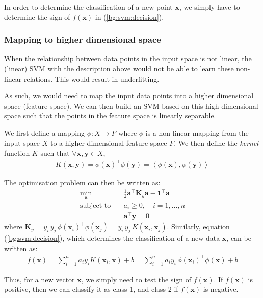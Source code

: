 \documentclass[12pt, twoside, a4paper]{article}
\def\vec{\boldsymbol}
\begin{document}
In order to determine the classification of a new  point $\vec{x}$, we simply have to determine the sign of $f(\vec{x})$ in (\ref{bg:svm:decision}).

\subsubsection{Mapping to higher dimensional space}
When the relationship between data points in the input space is not linear, the (linear) SVM with the description above would not be able to learn these non-linear relations. This would result in underfitting.

As such, we would need to map the input data points into a higher dimensional space (feature space). We can then build an SVM based on this high dimensional space such that the points in the feature space is linearly separable.

We first define a mapping $\phi : X \rightarrow F$ where $\phi$ is a non-linear mapping from the input space $X$ to a higher dimensional feature space $F$. We then define the \textit{kernel} function $K$ such that $\forall \vec x, \vec y \in X$,
\begin{align*}
K(\vec x, \vec y) = \phi(\vec x)^\top \phi(\vec{y}) = \left\langle \phi(\vec x) , \phi(\vec{y}) \right\rangle
\end{align*}

The optimisation problem can then be written as:
\begin{align*}
\min_{\vec a} \quad &\frac{1}{2} \vec{a}^\top \vec{K}_y \vec{a} - \vec{1}^\top \vec a \\
\text{subject to} \quad &a_i \geq 0, \quad i = 1, \dots , n \\
&\vec{a}^\top \vec y = 0
\end{align*}
where $\vec{K}_y = y_i \, y_j \, \phi(\vec{x}_i)^\top \phi(\vec{x}_j) = y_i \, y_j \, K(\vec{x}_i, \vec{x}_j)$. Similarly, equation (\ref{bg:svm:decision}), which determines the classification of a new data $\vec{x}$, can be written as:
\begin{align*}
f(\vec{x}) = \sum_{i=1}^n a_i y_i K(\vec{x}_i, \vec{x}) + b = \sum_{i=1}^n a_i y_i \, \phi(\vec{x}_i)^\top \phi(\vec{x}) + b
\end{align*}

Thus, for a new vector $\vec{x}$, we simply need to test the sign of $f(\vec{x})$. If $f(\vec{x})$ is positive, then we can classify it as class 1, and class 2 if $f(\vec{x})$ is negative.
\end{document}
